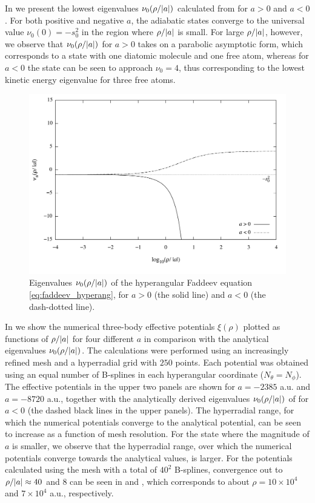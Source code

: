 In  we present the lowest eigenvalues $\nu_0(\rho/\lvert a\rvert)$ calculated from  for $a>0$ and $a<0$. For both positive and negative $a$, the adiabatic states converge to the universal value $\nu_0(0) = -s_0^2$ in the region where $\rho/\lvert a\rvert$ is small. For large $\rho/\lvert a\rvert$, however, we observe that $\nu_0(\rho/\lvert a\rvert)$ for $a>0$ takes on a parabolic asymptotic form, which corresponds to a state with one diatomic molecule and one free atom, whereas for $a<0$ the state can be seen to approach $\nu_0=4$, thus corresponding to the lowest kinetic energy eigenvalue for three free atoms.  

\begin{figure}[htbp!]
	\includegraphics[width=\linewidth]{faddeev.pdf}
	\caption{Eigenvalues $\nu_0(\rho/\lvert a\rvert)$ of the hyperangular Faddeev equation \eqref{eq:faddeev_hyperang}, for $a>0$ (the solid line) and $a<0$ (the dash-dotted line).}
	\label{fig:faddeev}
\end{figure}

In  we show the numerical three-body effective potentials $\xi(\rho)$ plotted as functions of $\rho/\lvert a\rvert$ for four different $a$ in comparison with the analytical eigenvalues $\nu_0(\rho/\lvert a\rvert)$. The calculations were performed using an increasingly refined mesh and a hyperradial grid with $250$ points. Each potential was obtained using an equal number of B-splines in each hyperangular coordinate ($N_{\theta} = N_{\phi}$). The effective potentials in the upper two panels are shown for  $a=-2385$ a.u. and  $a=-8720$ a.u., together with the analytically derived eigenvalues $\nu_0(\rho/\lvert a\rvert)$ of  for $a<0$ (the dashed black lines in the upper panels). The hyperradial range, for which the numerical potentials converge to the analytical potential, can be seen to increase as a function of mesh resolution. For the state where the magnitude of $a$ is smaller, we observe that the hyperradial range, over which the numerical potentials converge towards the analytical values, is larger. For the potentials calculated using the mesh with a total of $40^2$ B-splines, convergence out to $\rho/\lvert a\rvert \approx 40$ and $8$ can be seen in  and , which corresponds to about $\rho = 10 \times 10^4$ and $7 \times 10^4$ a.u., respectively.  

